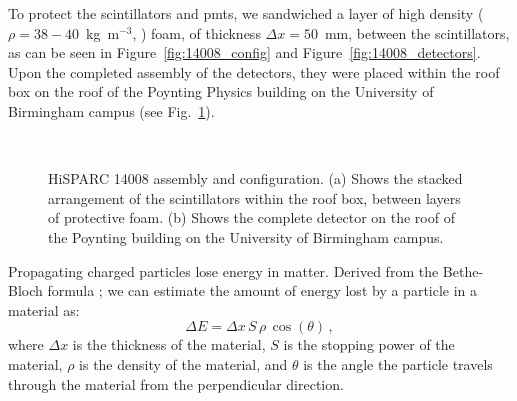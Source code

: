 To protect the scintillators and \glspl{pmt}, we sandwiched a layer of high density ($\rho = 38-40$~kg~m$^{-3}$, \citet{efoam_sf38_2017}) foam, of thickness $\Delta x = 50$~mm, between the scintillators, as can be seen in Figure~\ref{fig:14008_config} and Figure~\ref{fig:14008_detectors}. Upon the completed assembly of the detectors, they were placed within the roof box on the roof of the Poynting Physics building on the University of Birmingham campus (see Fig.~\ref{fig:HS_14008_setup}).


\begin{figure}[ht!]
	\centering
	 \\
	
	\caption{HiSPARC 14008 assembly and configuration. (a) Shows the stacked arrangement of the scintillators within the roof box, between layers of protective foam. (b) Shows the complete detector on the roof of the Poynting building on the University of Birmingham campus.}
	\label{fig:HS_14008_setup}
\end{figure}


Propagating charged particles lose energy in matter. Derived from the Bethe-Bloch formula \citep{bethe_bremsformel_1932, ziegler_stopping_1999}; we can estimate the amount of energy lost by a particle in a material as:
%
\begin{equation}
\Delta E = \Delta x \, S \, \rho \, \cos(\theta) \, ,
\label{eq:energy_loss}
\end{equation}
%
where $\Delta x$ is the thickness of the material, $S$ is the stopping power of the material, $\rho$ is the density of the material, and $\theta$ is the angle the particle travels through the material from the perpendicular direction.

